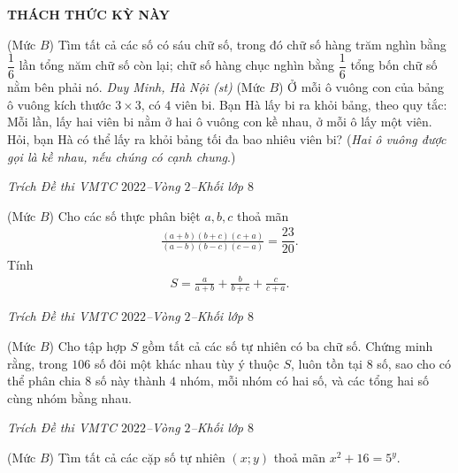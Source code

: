 \begin{center}
	\vspace*{-5pt}
	\textbf{\color{thachthuctoanhoc}\color{thachthuctoanhoc}\color{thachthuctoanhoc}THÁCH THỨC KỲ NÀY}
	\vspace*{-5pt}
\end{center}
\begin{multicols}{2}
	\setlength{\abovedisplayskip}{4pt}
	\setlength{\belowdisplayskip}{4pt}
	{}
	(Mức $B$) Tìm tất cả các số có sáu chữ số, trong đó chữ số hàng trăm nghìn bằng $\dfrac16$ lần tổng năm chữ số còn lại; chữ số hàng chục nghìn bằng $\dfrac16$  tổng bốn chữ số nằm bên phải nó.
	\vskip 0.05cm
	\hfill	\textit{\small Duy Minh, Hà Nội (st)}
	\vskip 0.05cm
	{}
	(Mức $B$)  Ở mỗi ô vuông con của bảng ô vuông kích thước $3\times3$, có $4$ viên bi. Bạn Hà lấy bi ra khỏi bảng, theo quy tắc: Mỗi lần, lấy hai viên bi nằm ở hai ô vuông con kề nhau, ở mỗi ô lấy một viên. Hỏi, bạn Hà có thể lấy ra khỏi bảng tối đa bao nhiêu viên bi?
	\vskip 0.05cm
	({\it Hai ô vuông được gọi là kề nhau, nếu chúng có cạnh chung}.)
	\begin{flushright}
		\textit{\small Trích Đề thi VMTC $2022$--Vòng $2$--Khối lớp $8$}
	\end{flushright}
	{\color{thachthuctoanhoc}{\usefont{T5}{qag}{b}{n} P693.}}
	(Mức $B$) Cho các số thực phân biệt $a,b,c$  thoả mãn
	\begin{align*}
		\frac{(a+b)(b+c)(c+a)}{(a-b)(b-c)(c-a)}=\dfrac{23}{20}.
	\end{align*}
	Tính
	\begin{align*}
		S=\frac{a}{a+b}+\frac{b}{b+c}+\frac{c}{c+a}.
	\end{align*}
	\begin{flushright}
		\textit{\small Trích Đề thi VMTC $2022$--Vòng $2$--Khối lớp $8$}
	\end{flushright}
	{\color{thachthuctoanhoc}{\usefont{T5}{qag}{b}{n} P694.}}
	(Mức $B$) Cho tập hợp $S$ gồm tất cả các số tự nhiên có ba chữ số. Chứng minh rằng, trong $106$ số đôi một khác nhau tùy ý thuộc $S$, luôn tồn tại $8$ số, sao cho có thể phân chia $8$ số này thành $4$ nhóm, mỗi nhóm có hai số, và các tổng hai số cùng nhóm bằng nhau.
	\begin{flushright}
		\textit{\small Trích Đề thi VMTC $2022$--Vòng $2$--Khối lớp $8$}
	\end{flushright}
	{}
	(Mức $B$) Tìm tất cả các cặp số tự nhiên $(x;y)$ thoả mãn $x^2+16=5^y$. 

\end{multicols}
